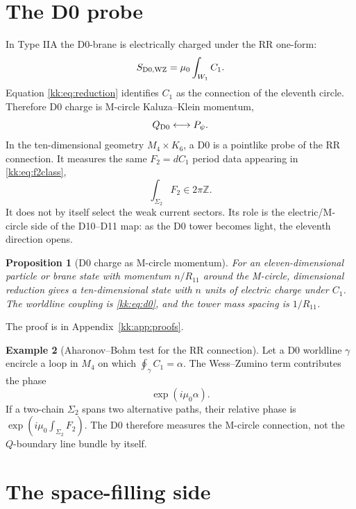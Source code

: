 \documentclass[11pt]{article}
\newcommand{\ZZ}{\mathbb{Z}}
\theoremstyle{plain}
\newtheorem{proposition}{Proposition}[section]
\theoremstyle{definition}
\newtheorem{example}[proposition]{Example}
\begin{document}
\section{The D0 probe}
\label{kk:sec:d0-probe}

In Type IIA the D0-brane is electrically charged under the RR one-form:
\begin{equation}
  S_{\rm D0,WZ}=\mu_0\int_{W_1}C_1 .
  \label{kk:eq:d0}
\end{equation}
Equation \eqref{kk:eq:reduction} identifies \(C_1\) as the connection of the
eleventh circle.  Therefore D0 charge is M-circle Kaluza--Klein momentum,
\begin{equation}
  Q_{\rm D0}\longleftrightarrow P_\psi .
  \label{kk:eq:d0momentum}
\end{equation}
In the ten-dimensional geometry \(M_4\times K_6\), a D0 is a pointlike probe of
the RR connection.  It measures the same \(F_2=dC_1\) period data appearing in
\eqref{kk:eq:f2class},
\begin{equation}
  \int_{\Sigma_2}F_2\in 2\pi\ZZ .
\end{equation}
It does not by itself select the weak current sectors.  Its role is the
electric/M-circle side of the D10--D11 map: as the D0 tower becomes light, the
eleventh direction opens.

\begin{proposition}[D0 charge as M-circle momentum]
\label{kk:prop:d0-momentum}
For an eleven-dimensional particle or brane state with momentum \(n/R_{11}\)
around the M-circle, dimensional reduction gives a ten-dimensional state with
\(n\) units of electric charge under \(C_1\).  The worldline coupling is
\eqref{kk:eq:d0}, and the tower mass spacing is \(1/R_{11}\).
\end{proposition}
The proof is in Appendix~\ref{kk:app:proofs}.

\begin{example}[Aharonov--Bohm test for the RR connection]
\label{kk:ex:d0-ab}
Let a D0 worldline \(\gamma\) encircle a loop in \(M_4\) on which
\(\oint_\gamma C_1=\alpha\).  The Wess--Zumino term contributes the phase
\[
  \exp\!\left(i\mu_0\alpha\right).
\]
If a two-chain \(\Sigma_2\) spans two alternative paths, their relative phase is
\(\exp(i\mu_0\int_{\Sigma_2}F_2)\).  The D0 therefore measures the M-circle
connection, not the \(Q\)-boundary line bundle by itself.
\end{example}

\section{The space-filling side}
\label{kk:sec:space-filling}
\end{document}
